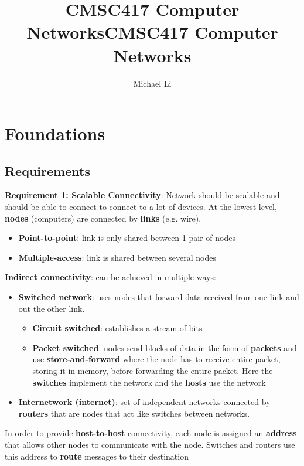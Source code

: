 \documentclass{article}
\date{}
\title{CMSC417 Computer Networks}
\begin{document}
 
  \author{Michael Li}
  \title{CMSC417 Computer Networks}
  \maketitle
  \tableofcontents
  \newpage
  \section{Foundations}
  \subsection{Requirements}
  \textbf{Requirement 1: Scalable Connectivity}: Network should be scalable and should be able to connect to connect to a lot of devices. At the lowest level, \textbf{nodes} (computers) are connected by \textbf{links} (e.g. wire).
  \begin{itemize}
    \item \textbf{Point-to-point}: link is only shared between 1 pair of nodes
    \item \textbf{Multiple-access}: link is shared between several nodes
  \end{itemize}
  \textbf{Indirect connectivity}: can be achieved in multiple ways:
  \begin{itemize}
    \item \textbf{Switched network}: uses nodes that forward data received from one link and out the other link.
      \begin{itemize}
        \item \textbf{Circuit switched}: establishes a stream of bits
        \item \textbf{Packet switched}: nodes send blocks of data in the form of \textbf{packets} and use \textbf{store-and-forward} where the node has to receive entire packet, storing it in memory, before forwarding the entire packet. Here the \textbf{switches} implement the network and the \textbf{hosts} use the network
      \end{itemize}
    \item \textbf{Internetwork (internet)}: set of independent networks connected by \textbf{routers} that are nodes that act like switches between networks.
  \end{itemize}
  In order to provide \textbf{host-to-host} connectivity, each node is assigned an \textbf{address} that allows other nodes to communicate with the node. Switches and routers use this address to \textbf{route} messages to their destination \\ \\
\end{document}
